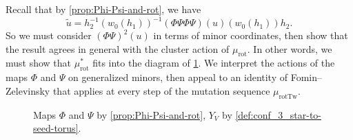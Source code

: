 \documentclass{amsart}
\theoremstyle{plain}
\theoremstyle{definition}
\theoremstyle{remark}
\newcommand{\minorcoordmap}{Y}
\newcommand{\murotind}{{\mu_{\text{rot}}^{\ast}}}
\newcommand{\murot}{{\mu_{\text{rot}}}}
\newcommand{\murottwist}{{\mu_{\text{rotTw}}}}
\begin{document}
  Recall that by \cref{prop:Phi-Psi-and-rot}, we have \[ \widetilde{u} =
    h_2^{-1} (w_0(h_1))^{-1} (\Phi \Psi \Phi \Psi)(u) (w_0(h_1)) h_2. \]
  So we must consider $(\Phi \Psi)^{2}(u)$ in terms of minor
  coordinates, then show that the result agrees in general with the
  cluster action of $\murot$. In other words, we must show that
  $\murotind$ fits into the diagram of \cref{fig:Psi-Phi-murot-cd}. We
  interpret the actions of the maps $\Phi$ and $\Psi$ on generalized
  minors, then appeal to an identity of Fomin--Zelevinsky that applies
  at every step of the mutation sequence $\murottwist$.

  \begin{figure}[h]
    \centering 

    \caption{Maps $\Phi$ and $\Psi$ by \cref{prop:Phi-Psi-and-rot},
      $\minorcoordmap_V$ by \cref{def:conf_3_star-to-seed-torus}.
      \label{fig:Psi-Phi-murot-cd}
    }
  \end{figure}
\end{document}
